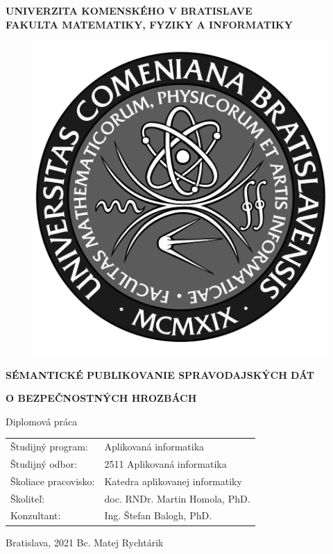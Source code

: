 \documentclass[12pt, a4paper, oneside]{book}
\newcommand\mftitle{Sémantické publikovanie spravodajských dát}
\newcommand\mftitlen{o bezpečnostných hrozbách}
\newcommand\mfthesistype{Diplomová práca}
\newcommand\mfauthor{Bc. Matej Rychtárik}
\newcommand\mfadvisor{doc. RNDr. Martin Homola, PhD.}
\newcommand\mfconsultant{Ing. Štefan Balogh, PhD.}
\newcommand\mfplacedate{Bratislava, 2021}
\newcommand\mfuniversity{UNIVERZITA KOMENSKÉHO V BRATISLAVE}
\newcommand\mffaculty{FAKULTA MATEMATIKY, FYZIKY A INFORMATIKY}
\begin{document}
\noindent
\begin{minipage}{\textwidth}
\begin{center}
\textbf{\mfuniversity \\
\mffaculty}
\end{center}
\end{minipage}

\vfill
\begin{figure}[!hbt]
\begin{center}
\includegraphics{images/logo_fmph_dark}
\label{img:logo_dark}
\end{center}
\end{figure}
\begin{center}
\begin{minipage}{0.8\textwidth}
\centerline{\textbf{\large\MakeUppercase{\mftitle}}}
\centerline{\textbf{\large\MakeUppercase{\mftitlen}}}
\smallskip
\centerline{\mfthesistype}
\end{minipage}
\end{center}
\vfill
\begin{tabular}{l l}
Študijný program: & Aplikovaná informatika\\
Študijný odbor: & 2511 Aplikovaná informatika\\
Školiace pracovisko: & Katedra aplikovanej informatiky\\
Školiteľ: & \mfadvisor \\
Konzultant: & \mfconsultant
\end{tabular}
\vfill
\noindent
\mfplacedate \hfill
\mfauthor
\eject 
\end{document}
